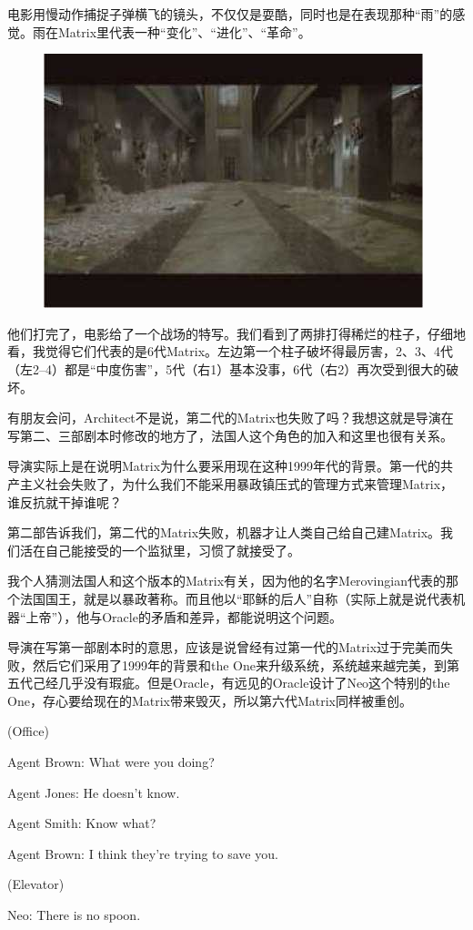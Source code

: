 \documentclass[UTF8]{ctexart}
\newenvironment{myquote}{\color{green} \setlength{\leftskip}{6em} \setlength{\rightskip}{4em} \setlength{\parindent}{-2em}}{\par}
\begin{document}
电影用慢动作捕捉子弹横飞的镜头，不仅仅是耍酷，同时也是在表现那种“雨”的感觉。雨在Matrix里代表一种“变化”、“进化”、“革命”。

\begin{figure}[htb]
\centering
\includegraphics[width=0.5\linewidth]{fig/read_Matrix-64}
\end{figure}

他们打完了，电影给了一个战场的特写。我们看到了两排打得稀烂的柱子，仔细地看，我觉得它们代表的是6代Matrix。左边第一个柱子破坏得最厉害，2、3、4代（左2--4）都是“中度伤害”，5代（右1）基本没事，6代（右2）再次受到很大的破坏。

有朋友会问，Architect不是说，第二代的Matrix也失败了吗？我想这就是导演在写第二、三部剧本时修改的地方了，法国人这个角色的加入和这里也很有关系。

导演实际上是在说明Matrix为什么要采用现在这种1999年代的背景。第一代的共产主义社会失败了，为什么我们不能采用暴政镇压式的管理方式来管理Matrix，谁反抗就干掉谁呢？

第二部告诉我们，第二代的Matrix失败，机器才让人类自己给自己建Matrix。我们活在自己能接受的一个监狱里，习惯了就接受了。

我个人猜测法国人和这个版本的Matrix有关，因为他的名字Merovingian代表的那个法国国王，就是以暴政著称。而且他以“耶稣的后人”自称（实际上就是说代表机器“上帝”），他与Oracle的矛盾和差异，都能说明这个问题。

导演在写第一部剧本时的意思，应该是说曾经有过第一代的Matrix过于完美而失败，然后它们采用了1999年的背景和the One来升级系统，系统越来越完美，到第五代己经几乎没有瑕疵。但是Oracle，有远见的Oracle设计了Neo这个特别的the One，存心要给现在的Matrix带来毁灭，所以第六代Matrix同样被重创。

\begin{myquote}
(Office)

Agent Brown: What were you doing?

Agent Jones: He doesn't know.

Agent Smith: Know what?

Agent Brown: I think they're trying to save you.

(Elevator)

Neo: There is no spoon.
\end{myquote}
\end{document}
